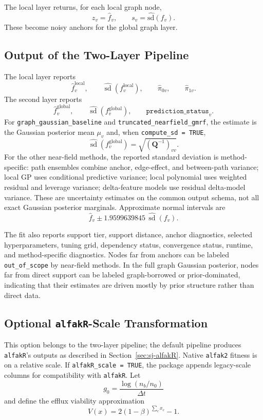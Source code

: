 \documentclass[11pt]{article}
\begin{document}
The local layer returns, for each local graph node,
\[
  z_v=\hat f_v,\qquad s_v=\widehat{\mathrm{sd}}(f_v).
\]
These become noisy anchors for the global graph layer.

\subsection{Output of the Two-Layer Pipeline}
\label{sec:s-output}

The local layer reports
\[
  \hat f_v^{\mathrm{local}},
  \qquad
  \widehat{\operatorname{sd}}(f_v^{\mathrm{local}}),
  \qquad
  \hat\pi_{0v},
  \qquad
  \hat\pi_{1v}.
\]
The second layer reports
\[
  \hat f_v^{\mathrm{global}},
  \qquad
  \widehat{\operatorname{sd}}(f_v^{\mathrm{global}}),
  \qquad
  \texttt{prediction\_status}_v.
\]
For \texttt{graph\_gaussian\_baseline} and
\texttt{truncated\_nearfield\_gmrf}, the estimate is the Gaussian posterior
mean $\mu_v$ and, when \texttt{compute\_sd = TRUE},
\[
  \widehat{\operatorname{sd}}(f_v^{\mathrm{global}})
  =
  \sqrt{(\bm Q^{-1})_{vv}}.
\]
For the other near-field methods, the reported standard deviation is
method-specific: path ensembles combine anchor, edge-effect, and between-path
variance; local GP uses conditional predictive variance; local polynomial uses
weighted residual and leverage variance; delta-feature models use residual
delta-model variance. These are uncertainty estimates on the common output
schema, not all exact Gaussian posterior marginals.
Approximate normal intervals are
\[
  \hat f_v \pm 1.9599639845\,\widehat{\operatorname{sd}}(f_v).
\]

The fit also reports support tier, support distance, anchor diagnostics,
selected hyperparameters, tuning grid, dependency status, convergence status,
runtime, and method-specific diagnostics. Nodes far from anchors can be labeled
\texttt{out\_of\_scope} by near-field methods. In the full graph Gaussian
posterior, nodes far from direct support can be labeled graph-borrowed or
prior-dominated, indicating that their estimates are driven mostly by prior
structure rather than direct data.

\subsection{Optional \texttt{alfakR}-Scale Transformation}
\label{sec:s-alfakR-scale}

This option belongs to the two-layer pipeline; the default pipeline produces
\texttt{alfakR}'s outputs as described in Section~\ref{sec:sj-alfakR}.
Native \texttt{alfak2} fitness is on a relative scale. If
\texttt{alfakR\_scale = TRUE}, the package appends legacy-scale columns for
compatibility with \texttt{alfakR}. Let
\[
  g_0=\frac{\log(n_b/n_0)}{\Delta t}
\]
and define the efflux viability approximation
\[
  V(x)=2(1-\beta)^{\sum_c x_c}-1.
\]
\end{document}
